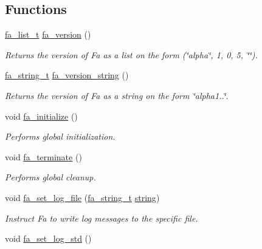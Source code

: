 \subsection*{Functions}
\begin{DoxyCompactItemize}
\item 
\hyperlink{group___fa_list_ga35ecb12ab934ded0cce0bcf28e3bc5d2}{fa\-\_\-list\-\_\-t} \hyperlink{group___fa_fa_ga10bbb957eedee5b2a3c8e91a169f9991}{fa\-\_\-version} ()
\begin{DoxyCompactList}\small\item\em Returns the version of Fa as a list on the form {\ttfamily (\char`\"{}alpha\char`\"{}, 1, 0, 5, \char`\"{}\char`\"{})}. \end{DoxyCompactList}\item 
\hyperlink{group___fa_string_gacada63033b77bc6c39fa632ae199349b}{fa\-\_\-string\-\_\-t} \hyperlink{group___fa_fa_ga0f32aba533df7023c5d0948d6506b94e}{fa\-\_\-version\-\_\-string} ()
\begin{DoxyCompactList}\small\item\em Returns the version of Fa as a string on the form \char`\"{}alpha1..\char`\"{}. \end{DoxyCompactList}\item 
void \hyperlink{group___fa_fa_ga061c945c3f013c84561593911b661a44}{fa\-\_\-initialize} ()
\begin{DoxyCompactList}\small\item\em Performs global initialization. \end{DoxyCompactList}\item 
void \hyperlink{group___fa_fa_ga66c7af3a85045329f71966dfe40a5acf}{fa\-\_\-terminate} ()
\begin{DoxyCompactList}\small\item\em Performs global cleanup. \end{DoxyCompactList}\item 
void \hyperlink{group___fa_fa_ga09490b15451aa64808537eb688aa4604}{fa\-\_\-set\-\_\-log\-\_\-file} (\hyperlink{group___fa_string_gacada63033b77bc6c39fa632ae199349b}{fa\-\_\-string\-\_\-t} \hyperlink{util_8h_a41106000aac73b61e4fc2ef9dd39a603}{string})
\begin{DoxyCompactList}\small\item\em Instruct Fa to write log messages to the specific file. \end{DoxyCompactList}\item 
void \hyperlink{group___fa_fa_gaadd396f69e7ae709c4e224d893ff90a6}{fa\-\_\-set\-\_\-log\-\_\-std} ()

\end{DoxyCompactItemize}
